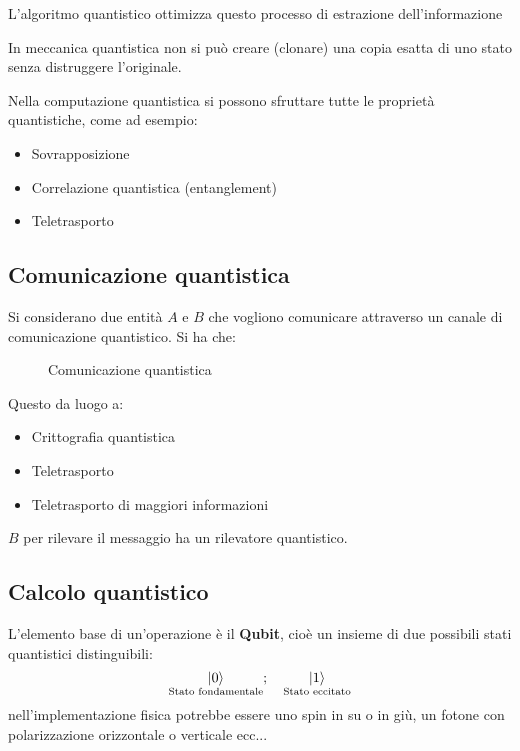 \documentclass[a4paper]{article}
\begin{document}
\noindent
L'algoritmo quantistico ottimizza questo processo di estrazione dell'informazione

\begin{theorem}
  In meccanica quantistica non si può creare (clonare) una copia esatta di uno stato
  senza distruggere l'originale.
\end{theorem}

\vspace{1em}
\noindent
Nella computazione quantistica si possono sfruttare tutte le proprietà quantistiche,
come ad esempio:
\begin{itemize}
  \item Sovrapposizione
  \item Correlazione quantistica (entanglement)
  \item Teletrasporto
\end{itemize}

\subsection{Comunicazione quantistica}
Si considerano due entità \( A \) e \( B \) che vogliono comunicare attraverso un
canale di comunicazione quantistico. Si ha che:
\begin{figure}[H]
  \centering
  \caption{Comunicazione quantistica}
\end{figure}
\noindent
Questo da luogo a:
\begin{itemize}
  \item Crittografia quantistica
  \item Teletrasporto
  \item Teletrasporto di maggiori informazioni
\end{itemize}
\( B \) per rilevare il messaggio ha un rilevatore quantistico.

\subsection{Calcolo quantistico}
L'elemento base di un'operazione è il \textbf{Qubit}, cioè un insieme di due possibili
stati quantistici distinguibili:
\[
  \underset{\text{Stato fondamentale}}{\ket{0}}; \quad
  \underset{\text{Stato eccitato}}{\ket{1}}
\] 
nell'implementazione fisica potrebbe essere uno spin in su o in giù, un fotone con
polarizzazione orizzontale o verticale ecc...
\end{document}
